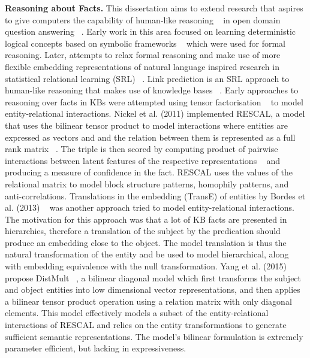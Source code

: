 \textbf{Reasoning about Facts.} This dissertation aims to extend research that aspires to give computers the capability of human-like reasoning ~\citep{bordes2011learning} in open domain question answering ~\citep{hakimov2019evaluating}. Early work in this area focused on learning deterministic logical concepts based on symbolic frameworks ~\citep{hohenecker2017deep} which were used for formal reasoning. Later, attempts to relax formal reasoning and make use of more flexible embedding representations of natural language inspired research in statistical relational learning (SRL) ~\citep{koller2007introduction}. Link prediction is an SRL approach to human-like reasoning that makes use of knowledge bases ~\citep{balazevic2019hypernetwork, dettmers2018convolutional, socher2013reasoning}. \newline
Early approaches to reasoning over facts in KBs were attempted using tensor factorisation ~\citep{nickel2011three} to model entity-relational interactions. Nickel et al. (2011) implemented RESCAL, a model that uses the bilinear tensor product to model interactions where entities are expressed as vectors and and the relation between them is represented as a full rank matrix ~\citep{nickel2012factorizing}. The triple is then scored by computing product of pairwise interactions between latent features of the respective representations ~\citep{nickel2015review} and producing a measure of confidence in the fact. RESCAL uses the values of the relational matrix to model block structure patterns, homophily patterns, and anti-correlations. \newline
Translations in the embedding (TransE) of entities by Bordes et al. (2013) ~\citep{bordes2013translating} was another approach tried to model entity-relational interactions. The motivation for this approach was that a lot of KB facts are presented in hierarchies, therefore a translation of the subject by the predication should produce an embedding close to the object. The model translation is thus the natural transformation of the entity and be used to model hierarchical, along with embedding equivalence with the null transformation. \newline
Yang et al. (2015) propose DistMult ~\citep{yang2014embedding}, a bilinear diagonal model which first transforms the subject and object entities into low dimensional vector representations, and then applies a bilinear tensor product operation using a relation matrix with only diagonal elements. This model effectively models a subset of the entity-relational interactions of RESCAL and relies on the entity transformations to generate sufficient semantic representations. The model's bilinear formulation is extremely parameter efficient, but lacking in expressiveness. \newline
